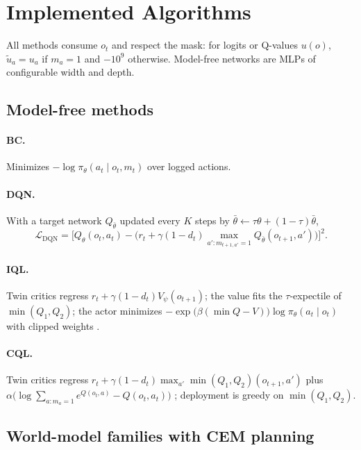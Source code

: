 \documentclass[10pt,twocolumn]{article}
\newcommand{\policy}{\pi}
\begin{document}
\section{Implemented Algorithms}
\label{sec:methods}

All methods consume $o_t$ and respect the mask: for logits or Q-values $u(o)$, $\widetilde u_a=u_a$ if $m_a=1$ and $-10^9$ otherwise. Model-free networks are MLPs of configurable width and depth.

\subsection{Model-free methods}

\paragraph{BC.} Minimizes $-\log\policy_\theta(a_t\mid o_t,m_t)$ over logged actions.

\paragraph{DQN.} With a target network $Q_{\bar\theta}$ updated every $K$ steps by $\bar\theta\leftarrow\tau\theta+(1-\tau)\bar\theta$,
\begin{equation}
 \mathcal{L}_{\mathrm{DQN}}=\Big[Q_\theta(o_t,a_t)-\big(r_t+\gamma(1-d_t)\max_{a':m_{t+1,a'}=1}Q_{\bar\theta}(o_{t+1},a')\big)\Big]^2.
\end{equation}

\paragraph{IQL.} Twin critics regress $r_t+\gamma(1-d_t)V_\psi(o_{t+1})$; the value fits the $\tau$-expectile of $\min(Q_1,Q_2)$; the actor minimizes $-\exp\big(\beta(\min Q-V)\big)\log\policy_\theta(a_t\mid o_t)$ with clipped weights \cite{kostrikov2022iql}.

\paragraph{CQL.} Twin critics regress $r_t+\gamma(1-d_t)\max_{a'}\min(Q_1,Q_2)(o_{t+1},a')$ plus $\alpha\big(\log\sum_{a:m_a=1}e^{Q(o_t,a)}-Q(o_t,a_t)\big)$ \cite{kumar2020cql}; deployment is greedy on $\min(Q_1,Q_2)$.

\subsection{World-model families with CEM planning}
\label{sec:worldmodels}
\end{document}
